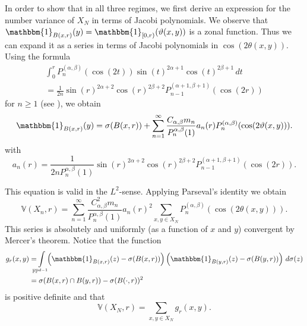 In order to show that in all three regimes, we first derive an expression for
the number variance of $X_N$ in terms of Jacobi polynomials. We observe that
$\mathbbm{1}_{B(x,r)}(y)=\mathbbm{1}_{[0,r)}(\theta(x,y))$ is a zonal
function. Thus we can expand it as a series in terms of Jacobi polynomials in
$\cos(2\theta(x,y))$. Using the formula
\begin{multline*}
  \int_0^rP_n^{(\alpha,\beta)}(\cos(2t))\sin(t)^{2\alpha+1}\cos(t)^{2\beta+1}\,dt\\
  =  \frac1{2n}\sin(r)^{2\alpha+2}\cos(r)^{2\beta+2}
  P_{n-1}^{(\alpha+1,\beta+1)}(\cos(2r))
\end{multline*}
for $n\geq1$ (see
\cite{Magnus_Oberhettinger_Soni1966:formulas_theorems_special}), we obtain
\begin{equation*}
  \mathbbm{1}_{B(x,r)}(y)=\sigma(B(x,r))+
  \sum_{n=1}^\infty\frac{C_{\alpha,\beta}m_n}{P_n^{\alpha,\beta}(1)}a_n(r)
  P_n^{(\alpha,\beta)}(\cos(2\theta(x,y))).
\end{equation*}
with
\begin{equation*}
  a_n(r)=\frac1{2nP_n^{\alpha,\beta}(1)}\sin(r)^{2\alpha+2}\cos(r)^{2\beta+2}
  P_{n-1}^{(\alpha+1,\beta+1)}(\cos(2r)).
\end{equation*}

This equation is valid in the $L^2$-sense. Applying Parseval's identity we
obtain
\begin{equation}
  \label{eq:var-Jacobi}
\mathbb{V}(X_n,r)=
\sum_{n=1}^\infty
    \frac{C_{\alpha,\beta}^2m_n}{P_n^{\alpha,\beta}(1)}a_n(r)^2
    \sum_{x,y\in X_N}P_n^{(\alpha,\beta)}(\cos(2\theta(x,y))).
\end{equation}
This series is absolutely and uniformly (as a function of $x$ and $y$)
convergent by Mercer's theorem. Notice that the function
\begin{equation}\label{eq:g_r-formula}
  \begin{split}
    g_r(x,y)&=\!\!\!\!\int\limits_{\mathbb{FP}^{d-1}}\!\!\!
    \left(\mathbbm{1}_{B(x,r)}(z)-\sigma(B(x,r))\right)
    \left(\mathbbm{1}_{B(y,r)}(z)-\sigma(B(y,r))\right)\,d\sigma(z)\\
    &=\sigma(B(x,r)\cap B(y,r))-\sigma(B(\cdot,r))^2
  \end{split}
\end{equation}
is positive definite and that
\begin{equation}\label{eq:v=gr}
  \mathbb{V}(X_N,r)=\sum_{x,y\in X_N}g_r(x,y).
\end{equation}


